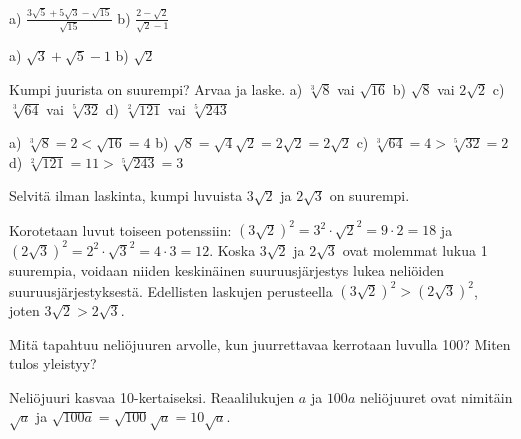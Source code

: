 \begin{tehtavasivu}
\begin{tehtava} 
a) $ \frac{3\sqrt{5}+5\sqrt{3}-\sqrt{15}}{\sqrt{15}}$  \quad b)  $ \frac{2-\sqrt{2}}{\sqrt{2}-1}$   \quad
\begin{vastaus}
a) $\sqrt{3}+\sqrt{5}-1$ \quad b) $\sqrt{2}$ \quad
\end{vastaus}
\end{tehtava}

\begin{tehtava} Kumpi juurista on suurempi? Arvaa ja laske.
a) $\sqrt[3]{8}$ vai $\sqrt{16}$ \quad b)  $\sqrt{8}$ vai $2\sqrt{2}$  \quad c) $\sqrt[3]{64}$ vai $\sqrt[5]{32}$ \quad d) $\sqrt[2]{121}$ vai $\sqrt[5]{243}$ 
\begin{vastaus}
a) $\sqrt[3]{8}=2<\sqrt{16}=4$ \quad b) $\sqrt{8}=\sqrt{4}\sqrt{2}=2\sqrt{2} = 2\sqrt{2}$ \quad c) $\sqrt[3]{64}=4>\sqrt[5]{32}=2$ \quad d) $\sqrt[2]{121}=11 >\sqrt[5]{243}=3$ 
\end{vastaus}
\end{tehtava}


\begin{tehtava}
        Selvitä ilman laskinta, kumpi luvuista $3\sqrt{2}$ ja $2\sqrt{3}$ on suurempi. 
       
        \begin{vastaus}
        Korotetaan luvut toiseen potenssiin: $(3\sqrt{2})^2=3^2\cdot\sqrt{2}^2=9 \cdot 2=18$ ja $(2\sqrt{3})^2=2^2\cdot\sqrt{3}^2=4 \cdot 3=12$. Koska $3\sqrt{2}$ ja $2\sqrt{3}$ ovat molemmat lukua 1 suurempia, voidaan niiden keskinäinen suuruusjärjestys lukea neliöiden suuruusjärjestyksestä. Edellisten laskujen perusteella $(3\sqrt{2})^2 > (2\sqrt{3})^2$, joten $3\sqrt{2} > 2\sqrt{3}$.
        \end{vastaus}
\end{tehtava}

\begin{tehtava}
        Mitä tapahtuu neliöjuuren arvolle, kun juurrettavaa kerrotaan luvulla 100? Miten tulos yleistyy?
       
        \begin{vastaus}
        Neliöjuuri kasvaa 10-kertaiseksi. Reaalilukujen $a$ ja $100a$ neliöjuuret ovat nimitäin $\sqrt{a}$ ja $\sqrt{100a}=\sqrt{100}\sqrt{a}=10\sqrt{a}$.
        

\end{vastaus}
\end{tehtava}
\end{tehtavasivu}
